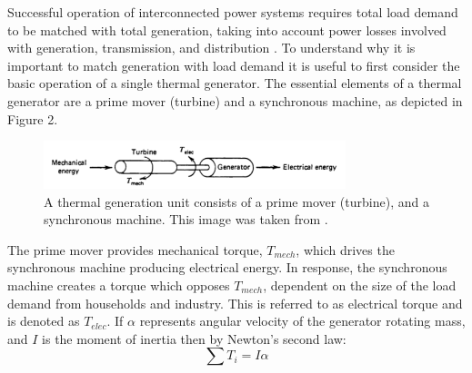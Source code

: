 \documentclass[12pt, a4paper]{article}
\begin{document}
Successful operation of interconnected power systems requires total load demand to be matched with total generation, taking into account power losses involved with generation, transmission, and distribution \cite{Wood2013}. To understand why it is important to match generation with load demand it is useful to first consider the basic operation of a single thermal generator. The essential elements of a thermal generator are a prime mover (turbine) and a synchronous machine, as depicted in Figure 2.
\begin{figure}[h]
\centering
\includegraphics[height=1.4cm]{generation}
\caption{A thermal generation unit consists of a prime mover (turbine), and a synchronous machine. This image was taken from \cite{Wood2013}.}
\end{figure}

The prime mover provides mechanical torque, $T_{mech}$, which drives the synchronous machine producing electrical energy. In response, the synchronous machine creates a torque which opposes $T_{mech}$, dependent on the size of the load demand from households and industry. This is referred to as electrical torque and is denoted as $T_{elec}$. If $\alpha$ represents angular velocity of the generator rotating mass, and $I$ is the moment of inertia then by Newton's second law:
\begin{equation}
\sum T_i = I \alpha 
\end{equation}
\end{document}
